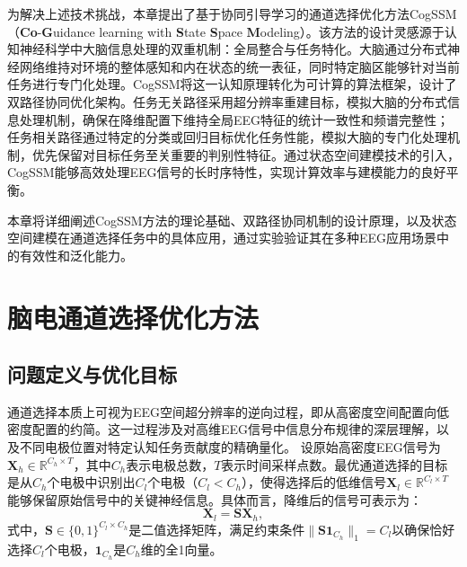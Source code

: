 为解决上述技术挑战，本章提出了基于协同引导学习的通道选择优化方法CogSSM（\textbf{Co}-\textbf{G}uidance learning with \textbf{S}tate \textbf{S}pace \textbf{M}odeling）。该方法的设计灵感源于认知神经科学中大脑信息处理的双重机制：全局整合与任务特化\cite{bertolero2015modular, ito2020cortical}。大脑通过分布式神经网络维持对环境的整体感知和内在状态的统一表征，同时特定脑区能够针对当前任务进行专门化处理\cite{majovski1982cognitive, kanwisher2010functional}。CogSSM将这一认知原理转化为可计算的算法框架，设计了双路径协同优化架构。任务无关路径采用超分辨率重建目标\cite{zhang2024maser}，模拟大脑的分布式信息处理机制，确保在降维配置下维持全局EEG特征的统计一致性和频谱完整性；任务相关路径通过特定的分类或回归目标优化任务性能，模拟大脑的专门化处理机制，优先保留对目标任务至关重要的判别性特征。通过状态空间建模技术的引入，CogSSM能够高效处理EEG信号的长时序特性，实现计算效率与建模能力的良好平衡。

本章将详细阐述CogSSM方法的理论基础、双路径协同机制的设计原理，以及状态空间建模在通道选择任务中的具体应用，通过实验验证其在多种EEG应用场景中的有效性和泛化能力。


\section{脑电通道选择优化方法}
\subsection{问题定义与优化目标}
通道选择本质上可视为EEG空间超分辨率的逆向过程，即从高密度空间配置向低密度配置的约简。这一过程涉及对高维EEG信号中信息分布规律的深层理解，以及不同电极位置对特定认知任务贡献度的精确量化\cite{alotaiby2015review}。
设原始高密度EEG信号为$\mathbf{X}_h \in \mathbb{R}^{C_h \times T}$，其中$C_h$表示电极总数，$T$表示时间采样点数。最优通道选择的目标是从$C_h$个电极中识别出$C_l$个电极（$C_l < C_h$），使得选择后的低维信号$\mathbf{X}_l \in \mathbb{R}^{C_l \times T}$能够保留原始信号中的关键神经信息\cite{alyasseri2020person}。具体而言，降维后的信号可表示为：
\begin{equation}
    \mathbf{X}_l = \mathbf{S} \mathbf{X}_h,
\end{equation}
式中，$\mathbf{S} \in \{0, 1\}^{C_l \times C_h}$是二值选择矩阵，满足约束条件$\|\mathbf{S} \mathbf{1}_{C_h}\|_1 = C_l$以确保恰好选择$C_l$个电极，$\mathbf{1}_{C_h}$是$C_h$维的全1向量。

